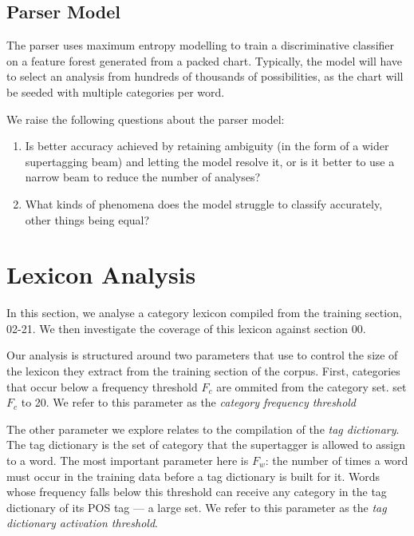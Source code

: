\subsection{Parser Model}

The \candc parser uses maximum entropy modelling to train a discriminative classifier on a feature forest generated from a packed chart. Typically, the model will have to select an analysis from hundreds of thousands of possibilities, as the chart will be seeded with multiple categories per word.

We raise the following questions about the parser model:

\begin{enumerate}
 \item Is better accuracy achieved by retaining ambiguity (in the form of a wider supertagging beam) and letting the model resolve it, or is it better to use a narrow beam to reduce the number of analyses?
 \item What kinds of phenomena does the model struggle to classify accurately, other things being equal?
\end{enumerate}
 
\section{Lexicon Analysis}

In this section, we analyse a category lexicon compiled from the \ccgbank training section, 02-21. We then investigate the coverage of this lexicon against section 00.

Our analysis is structured around two parameters that \candc use to control the size of the lexicon they extract from the training section of the corpus. First, categories that occur below a frequency threshold $F_c$ are ommited from the category set. \candc set $F_c$ to 20. We refer to this parameter as the \emph{category frequency threshold}

The other parameter we explore relates to the compilation of the \emph{tag dictionary}. The tag dictionary is the set of category that the supertagger is allowed to assign to a word. The most important parameter here is $F_w$: the number of times a word must occur in the training data before a tag dictionary is built for it. Words whose frequency falls below this threshold can receive any category in the tag dictionary of its POS tag --- a large set. We refer to this parameter as the \emph{tag dictionary activation threshold}.



